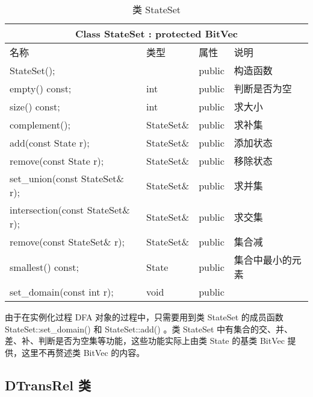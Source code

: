
\begin{table}[!htbp]
    \caption{类 StateSet}
    \label{tab:Class-StateSet}
    \centering
    \small%
    \setlength{\tabcolsep}{4pt}%
    \renewcommand{\arraystretch}{1.2}%
        \begin{tabular}{llll} %
        \toprule 
         \multicolumn{4}{c}{Class StateSet : protected BitVec} \\
        \midrule
        名称& 类型 & 属性  &\mbox{说明} \\
        \midrule 
        StateSet(); &  &  public & 构造函数 \\
        empty() const; & int & public & 判断是否为空\\
        size() const;  & int & public & 求大小\\
        complement();  & StateSet\& & public & 求补集 \\
        add(const State r);  & StateSet\& & public & 添加状态 \\
        remove(const State r);  & StateSet\& & public & 移除状态 \\
        set\_union(const StateSet\& r);  & StateSet\& & public & 求并集 \\
        intersection(const StateSet\& r);  & StateSet\& & public & 求交集 \\
        remove(const StateSet\& r);  & StateSet\& & public & 集合减 \\
        smallest() const; & State & public & 集合中最小的元素 \\
        set\_domain(const int r); & void & public & \\
        \bottomrule 
    \end{tabular}
\end{table}

由于在实例化过程 DFA 对象的过程中，只需要用到类 StateSet 的成员函数 StateSet::set\_domain() 和 StateSet::add() 。类 StateSet 中有集合的交、并、差、补、判断是否为空集等功能，这些功能实际上由类 State 的基类 BitVec 提供，这里不再赘述类 BitVec 的内容。


\subsection{DTransRel 类}

